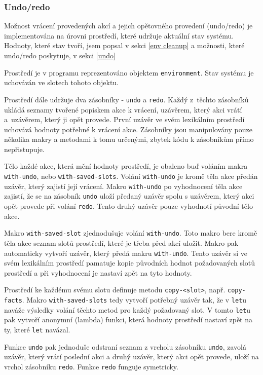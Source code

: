 \subsubsection{Undo/redo}

Možnost vrácení provedených akcí a jejich opětovného provedení (undo/redo) je
implementována na úrovni prostředí, které udržuje aktuální stav systému.
Hodnoty, které stav tvoří, jsem popsal v sekci \ref{env cleanup} a možnosti,
které undo/redo poskytuje, v sekci \ref{undo}

Prostředí je v programu reprezentováno objektem \verb|environment|. Stav
systému je uchováván ve slotech tohoto objektu.

Prostředí dále udržuje dva zásobníky - \verb|undo| a \verb|redo|.
Každý z~těchto zásobníků ukládá seznamy tvořené popiskem akce k vrácení,
uzávěrem, který akci vrátí a~uzávěrem, který ji opět provede. První uzávěr ve
svém lexikálním prostředí uchovává hodnoty potřebné k vrácení akce. Zásobníky
jsou manipulovány pouze několika makry a metodami k tomu určenými, zbytek kódu k
zásobníkům přímo nepřistupuje.

Tělo každé akce, která mění hodnoty prostředí, je obaleno buď voláním makra
\verb|with-undo|, nebo \verb|with-saved-slots|. Volání \verb|with-undo| je kromě
těla akce předán uzávěr, který zajistí její vrácení. Makro \verb|with-undo|
po vyhodnocení těla akce zajistí, že se na zásobník \verb|undo| uloží předaný
uzávěr spolu s uzávěrem, který akci opět provede při volání \verb|redo|.
Tento druhý uzávěr pouze vyhodnotí původní tělo akce.

Makro \verb|with-saved-slot| zjednodušuje volání \verb|with-undo|. Toto makro
bere kromě těla akce seznam slotů prostředí, které je třeba před akcí uložit.
Makro pak automaticky vytvoří uzávěr, který předá makru \verb|with-undo|. Tento
uzávěr si ve svém lexikálním prostředí pamatuje kopie původních hodnot požadovaných
slotů prostředí a při vyhodnocení je nastaví zpět na tyto hodnoty.

Prostředí ke každému svému slotu definuje metodu \verb|copy-<slot>|, např.
\verb|copy-facts|. Makro \verb|with-saved-slots| tedy vytvoří potřebný uzávěr
tak, že v \verb|let|u naváže výsledky volání těchto metod pro každý požadovaný
slot. V tomto \verb|let|u pak vytvoří anonymní (lambda) funkci, která hodnoty
prostředí nastaví zpět na ty, které \verb|let| navázal.

Funkce \verb|undo| pak jednoduše odstraní seznam z vrcholu zásobníku
\verb|undo|, zavolá uzávěr, který vrátí poslední akci a druhý uzávěr, který akci
opět provede, uloží na vrchol zásobníku \verb|redo|. Funkce \verb|redo| funguje
symetricky.


